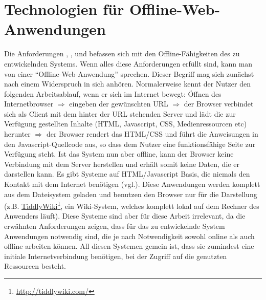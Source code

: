 \section{Technologien für Offline-Web-Anwendungen}
Die Anforderungen , ,  und  befassen sich mit den Offline-Fähigkeiten des zu entwickelnden Systems. Wenn alles diese Anforderungen erfüllt sind, kann man von einer "`Offline-Web-Anwendung"' sprechen. Dieser Begriff mag sich zunächst nach einem Widerspruch in sich anhören. Normalerweise kennt der Nutzer den folgenden Arbeitsablauf, wenn er sich im Internet bewegt: Öffnen des Internetbrowser $\Rightarrow$ eingeben der gewünschten URL $\Rightarrow$ der Browser verbindet sich als Client mit dem hinter der URL stehenden Server und lädt die zur Verfügung gestellten Inhalte (HTML, Javascript, CSS, Medienressourcen etc) herunter $\Rightarrow$ der Browser rendert das HTML/CSS und führt die Anweisungen in den Javascript-Quellcode aus, so dass dem Nutzer eine funktionsfähige Seite zur Verfügung steht. Ist das System nun aber offline, kann der Browser keine Verbindung mit dem Server herstellen und erhält somit keine Daten, die er darstellen kann. Es gibt Systeme auf HTML/Javascript Basis, die niemals den Kontakt mit dem Internet benötigen (vgl.\cite{Mahemoff22010}). Diese Anwendungen werden komplett aus dem Dateisystem geladen und benutzen den Browser nur für die Darstellung (z.B. \href{http://tiddlywiki.com}{TiddlyWiki}\footnote{\url{http://tiddlywiki.com/}}, ein Wiki-System, welches komplett lokal auf dem Rechner des Anwenders läuft). Diese Systeme sind aber für diese Arbeit irrelevant, da die erwähnten Anforderungen zeigen, dass für das zu entwickelnde System Anwendungen notwendig sind, die je nach Notwendigkeit sowohl online als auch offline arbeiten können. All diesen Systemen gemein ist, dass sie zumindest eine initiale Internetverbindung benötigen, bei der Zugriff auf die genutzten Ressourcen besteht.

